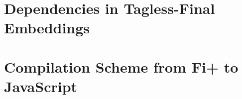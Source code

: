 \chapter{Dependencies in Tagless-Final Embeddings}

\chapter{Compilation Scheme from Fi+ to JavaScript}
